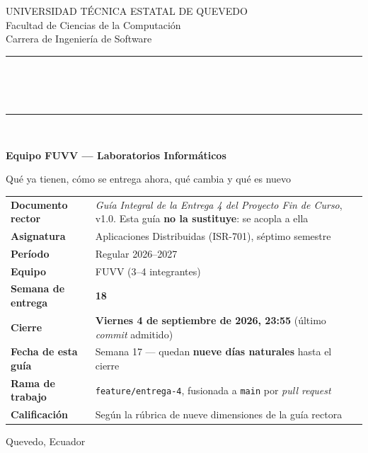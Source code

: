 \documentclass[11pt,a4paper]{article}
\begin{document}
\begin{titlepage}
	\centering
	\vspace*{0.8cm}
	{\small\color{uteqGray} UNIVERSIDAD TÉCNICA ESTATAL DE QUEVEDO\\ Facultad de Ciencias de la Computación\\ Carrera de Ingeniería de Software\par}
	\vspace{14pt}
	{\color{uteqBlue}\rule{\textwidth}{2pt}}\\[7pt]
	\colorbox{uteqBlue}{\parbox{0.96\textwidth}{\centering{}\vspace{5pt}}}\\[7pt]
	{\color{uteqBlue}\rule{\textwidth}{2pt}}\\[16pt]
	{\LARGE\bfseries\color{uteqBlue} Equipo FUVV --- Laboratorios Informáticos\par}
	\vspace{5pt}
	{\large\color{uteqGray} Qué ya tienen, cómo se entrega ahora, qué cambia y qué es nuevo\par}
	\vspace{20pt}
	\begin{minipage}{0.93\textwidth}
		\small
		\begin{tabular}{@{}p{4.6cm}p{9.8cm}@{}}
			\toprule
			\textbf{Documento rector} & \emph{Guía Integral de la Entrega 4 del Proyecto Fin de Curso}, v1.0. Esta guía \textbf{no la sustituye}: se acopla a ella \\
			\textbf{Asignatura} & Aplicaciones Distribuidas (ISR-701), séptimo semestre \\
			\textbf{Período} & Regular 2026--2027 \\
			\textbf{Equipo} & FUVV (3--4 integrantes) \\
			\textbf{Semana de entrega} & \textbf{18} \\
			\textbf{Cierre} & \textbf{Viernes 4 de septiembre de 2026, 23:55} (último \emph{commit} admitido) \\
			\textbf{Fecha de esta guía} & Semana 17 --- quedan \textbf{nueve días naturales} hasta el cierre \\
			\textbf{Rama de trabajo} & \texttt{feature/entrega-4}, fusionada a \texttt{main} por \emph{pull request} \\
			\textbf{Calificación} & Según la rúbrica de nueve dimensiones de la guía rectora \\
			\bottomrule
		\end{tabular}
	\end{minipage}
	\vfill
	{\small\color{uteqGray} Quevedo, Ecuador\par}
\end{titlepage}
\end{document}
